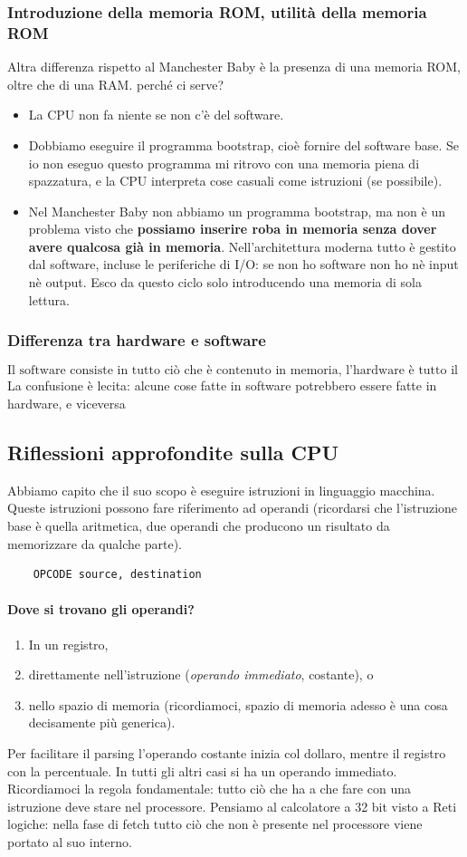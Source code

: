 \subsubsection{Introduzione della memoria ROM, utilità della memoria ROM} Altra differenza rispetto al Manchester Baby è la presenza di una memoria ROM, oltre che di una RAM. perché ci serve?
\begin{itemize}
	\item La CPU non fa niente se non c'è del software.
	\item Dobbiamo eseguire il programma bootstrap, cioè fornire del software base. Se io non eseguo questo programma mi ritrovo con una memoria piena di spazzatura, e la CPU interpreta cose casuali come istruzioni (se possibile).
	\item Nel Manchester Baby non abbiamo un programma bootstrap, ma non è un problema visto che \textbf{possiamo inserire roba in memoria senza dover avere qualcosa già in memoria}. Nell'architettura moderna tutto è gestito dal software, incluse le periferiche di I/O: se non ho software non ho nè input nè output. Esco da questo ciclo solo introducendo una memoria di sola lettura.
\end{itemize}
\subsubsection{Differenza tra hardware e software} 
\[\boxed{\text{Il software consiste in tutto ciò che è contenuto in memoria, l'hardware è tutto il resto.}}\]
La confusione è lecita: alcune cose fatte in software potrebbero essere fatte in hardware, e viceversa
\clearpage
\subsection{Riflessioni approfondite sulla CPU} 
Abbiamo capito che il suo scopo è eseguire istruzioni in linguaggio macchina. Queste istruzioni possono fare riferimento ad operandi (ricordarsi che l'istruzione base è quella aritmetica, due operandi che producono un risultato da memorizzare da qualche parte).
\begin{verbatim}
	OPCODE source, destination
\end{verbatim}
\paragraph{Dove si trovano gli operandi?}
\begin{enumerate}
	\item In un registro,
	\item direttamente nell'istruzione (\emph{operando immediato}, costante), o
	\item nello spazio di memoria (ricordiamoci, spazio di memoria adesso è una cosa decisamente più generica).
\end{enumerate}
Per facilitare il parsing l'operando costante inizia col dollaro, mentre il registro con la percentuale. In tutti gli altri casi si ha un operando immediato. Ricordiamoci la regola fondamentale: tutto ciò che ha a che fare con una istruzione deve stare nel processore. Pensiamo al calcolatore a 32 bit visto a Reti logiche: nella fase di fetch tutto ciò che non è presente nel processore viene portato al suo interno.


